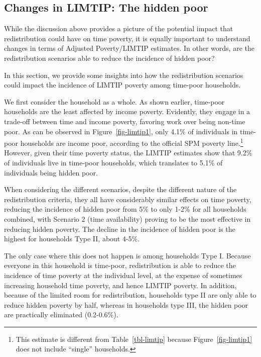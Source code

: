 \documentclass[
  11pt,
]{article}
\begin{document}
\subsection{Changes in LIMTIP: The hidden
poor}\label{changes-in-limtip-the-hidden-poor}

While the discussion above provides a picture of the potential impact
that redistribution could have on time poverty, it is equally important
to understand changes in terms of Adjusted Poverty/LIMTIP estimates. In
other words, are the redistribution scenarios able to reduce the
incidence of hidden poor?

In this section, we provide some insights into how the redistribution
scenarios could impact the incidence of LIMTIP poverty among time-poor
households.

We first consider the household as a whole. As shown earlier, time-poor
households are the least affected by income poverty. Evidently, they
engage in a trade-off between time and income poverty, favoring work
over being non-time poor. As can be observed in
Figure~\ref{fig-limtip1}, only 4.1\% of individuals in time-poor
households are income poor, according to the official SPM poverty
line.\footnote{This estimate is different from Table~\ref{tbl-limtip}
  because Figure~\ref{fig-limtip1} does not include ``single''
  households.} However, given their time poverty status, the LIMTIP
estimates show that 9.2\% of individuals live in time-poor households,
which translates to 5.1\% of individuals being hidden poor.

When considering the different scenarios, despite the different nature
of the redistribution criteria, they all have considerably similar
effects on time poverty, reducing the incidence of hidden poor from 5\%
to only 1-2\% for all households combined, with Scenario 2 (time
availability) proving to be the most effective in reducing hidden
poverty. The decline in the incidence of hidden poor is the highest for
households Type II, about 4-5\%.

The only case where this does not happen is among households Type I.
Because everyone in this household is time-poor, redistribution is able
to reduce the incidence of time poverty at the individual level, at the
expense of sometimes increasing household time poverty, and hence LIMTIP
poverty. In addition, because of the limited room for redistribution,
households type II are only able to reduce hidden poverty by half,
whereas in households type III, the hidden poor are practically
eliminated (0.2-0.6\%).
\end{document}
